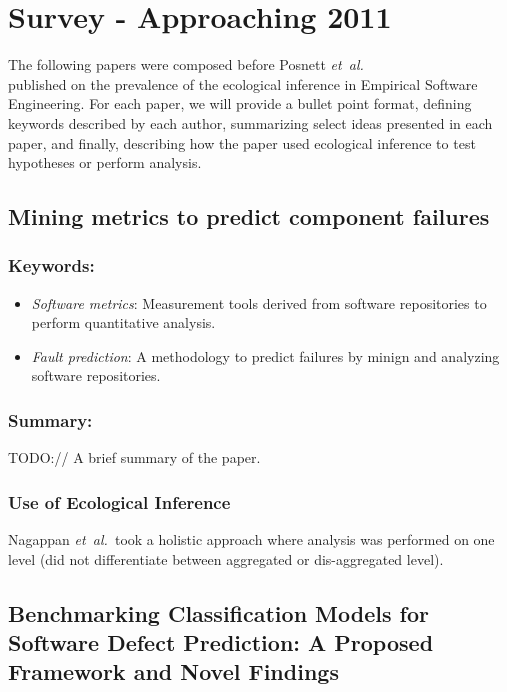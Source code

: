 \documentclass{sig-alternate-05-2015}
\newcommand{\etal}{\mbox{\emph{et al.\ }}}
\begin{document}
\section{Survey - Approaching 2011}

The following papers were composed before Posnett \etal  \\
published on the prevalence of the ecological inference in Empirical Software Engineering.  For each paper, we will provide a bullet point format, defining keywords described by each author, summarizing select ideas presented in each paper, and finally, describing how the paper used ecological inference to test hypotheses or perform analysis.

\subsection{Mining metrics to predict component failures \cite{Nagappan:2006}}

\subsubsection{Keywords:}
\begin{itemize}
\item \emph{Software metrics}: Measurement tools derived from software repositories to perform quantitative analysis.
\item \emph{Fault prediction}:  A methodology to predict failures by minign and analyzing software repositories.
\end{itemize} 

\subsubsection{Summary:}
TODO:// A brief summary of the paper.

\subsubsection{Use of Ecological Inference}
Nagappan \etal  took a holistic approach where analysis was performed on one level (did not differentiate between aggregated or dis-aggregated level).

\subsection{Benchmarking Classification Models for Software Defect Prediction: A Proposed Framework and Novel Findings \cite{Lessmann:2008}}
\end{document}
